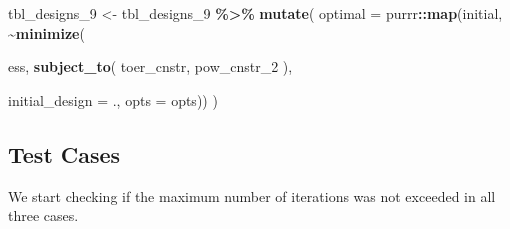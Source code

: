\documentclass[
]{book}
\newenvironment{Shaded}{\begin{snugshade}}{\end{snugshade}}
\newcommand{\DataTypeTok}[1]{\textcolor[rgb]{0.13,0.29,0.53}{#1}}
\newcommand{\DecValTok}[1]{\textcolor[rgb]{0.00,0.00,0.81}{#1}}
\newcommand{\KeywordTok}[1]{\textcolor[rgb]{0.13,0.29,0.53}{\textbf{#1}}}
\newcommand{\NormalTok}[1]{#1}
\newcommand{\OperatorTok}[1]{\textcolor[rgb]{0.81,0.36,0.00}{\textbf{#1}}}
\newcommand{\StringTok}[1]{\textcolor[rgb]{0.31,0.60,0.02}{#1}}
\begin{document}
\begin{Shaded}
\begin{Highlighting}[]
\NormalTok{tbl\_designs\_}\DecValTok{9}\NormalTok{ \textless{}{-}}\StringTok{ }\NormalTok{tbl\_designs\_}\DecValTok{9} \OperatorTok{\%\textgreater{}\%}\StringTok{ }
\StringTok{    }\KeywordTok{mutate}\NormalTok{(}
       \DataTypeTok{optimal =}\NormalTok{ purrr}\OperatorTok{::}\KeywordTok{map}\NormalTok{(initial, }\OperatorTok{\textasciitilde{}}\KeywordTok{minimize}\NormalTok{(}
         
\NormalTok{          ess,}
          \KeywordTok{subject\_to}\NormalTok{(}
\NormalTok{              toer\_cnstr,}
\NormalTok{              pow\_cnstr\_}\DecValTok{2}
\NormalTok{          ),}
          
          \DataTypeTok{initial\_design =}\NormalTok{ ., }
          \DataTypeTok{opts           =}\NormalTok{ opts)) )}
\end{Highlighting}
\end{Shaded}

\hypertarget{test-cases-8}{%
\subsection{Test Cases}\label{test-cases-8}}

We start checking if the maximum number of iterations was not exceeded in all
three cases.

\begin{Shaded}
\end{Shaded}
\end{document}
